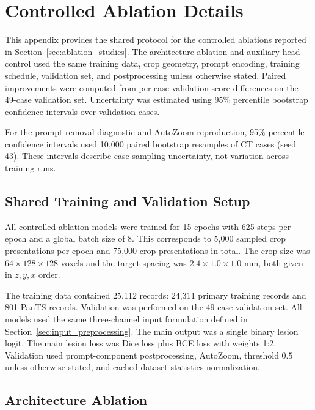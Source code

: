 \section{Controlled Ablation Details}
\label{app:controlled_ablation_details}

This appendix provides the shared protocol for the controlled ablations reported in Section~\ref{sec:ablation_studies}. The architecture ablation and auxiliary-head control used the same training data, crop geometry, prompt encoding, training schedule, validation set, and postprocessing unless otherwise stated. Paired improvements were computed from per-case validation-score differences on the 49-case validation set. Uncertainty was estimated using 95\% percentile bootstrap confidence intervals over validation cases.

For the prompt-removal diagnostic and AutoZoom reproduction, 95\% percentile confidence intervals used 10,000 paired bootstrap resamples of CT cases (seed 43). These intervals describe case-sampling uncertainty, not variation across training runs.

\subsection{Shared Training and Validation Setup}
\label{app:shared_ablation_setup}

All controlled ablation models were trained for 15 epochs with 625 steps per epoch and a global batch size of 8. This corresponds to 5,000 sampled crop presentations per epoch and 75,000 crop presentations in total. The crop size was \(64 \times 128 \times 128\) voxels and the target spacing was \(2.4 \times 1.0 \times 1.0\) mm, both given in \(z,y,x\) order.

The training data contained 25,112 records: 24,311 primary training records and 801 PanTS records. Validation was performed on the 49-case validation set. All models used the same three-channel input formulation defined in Section~\ref{sec:input_preprocessing}. The main output was a single binary lesion logit. The main lesion loss was Dice loss plus BCE loss with weights 1:2. Validation used prompt-component postprocessing, AutoZoom, threshold \(0.5\) unless otherwise stated, and cached dataset-statistics normalization.


\subsection{Architecture Ablation}
\label{app:architecture_ablation_details}

